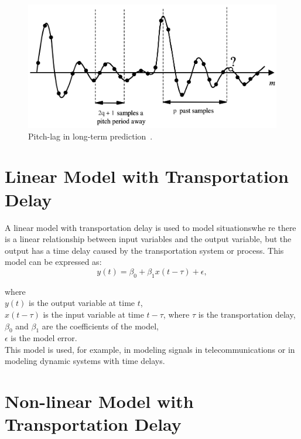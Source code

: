 \documentclass[12pt]{report}
\begin{document}
%
\begin{center}
    \begin{figure}[!ht]
        \centering
        \includegraphics[width=\columnwidth]{shift}
        \caption{Pitch-lag in long-term prediction~\cite{WOS:000266982600001}.}
        \label{fig1}
    \end{figure}
\end{center}

\section{Linear Model with Transportation Delay}

A linear model with transportation delay is used to model situationswhe
re there is a linear relationship between input variables and the
output variable, but the output has a time delay caused by the
transportation system or process. This model can be expressed as:\\

\begin{equation}
    y(t) = \beta_0 + \beta_1 x(t - \tau) + \epsilon,
\end{equation}

\noindent where\\
\( y(t) \) is the output variable at time \( t \),\\
\( x(t - \tau) \) is the input variable at time \( t - \tau \), where \( \tau \) is the transportation delay,\\
\( \beta_0 \) and \( \beta_1 \) are the coefficients of the model,\\
\( \epsilon \) is the model error.\\

\noindent This model is used, for example, in modeling signals in telecommunications
or in modeling dynamic systems with time delays.

\section{Non-linear Model with Transportation Delay}
\end{document}
